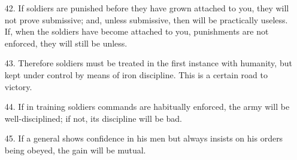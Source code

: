 \documentclass[11pt,openany]{memoir}
\newcommand{\enumeratemargin}{1.30em}
\begin{document}
\begin{enumerate}[leftmargin=\enumeratemargin]
\item[42.] If soldiers are punished before they have grown attached to you, they will not prove submissive; and, unless submissive, then will be practically useless. If, when the soldiers have become attached to you, punishments are not enforced, they will still be unless.
\item[43.] Therefore soldiers must be treated in the first instance with humanity, but kept under control by means of iron discipline. This is a certain road to victory.
\item[44.] If in training soldiers commands are habitually enforced, the army will be well-disciplined; if not, its discipline will be bad.
\item[45.] If a general shows confidence in his men but always insists on his orders being obeyed, the gain will be mutual.
\end{enumerate}
\end{document}
